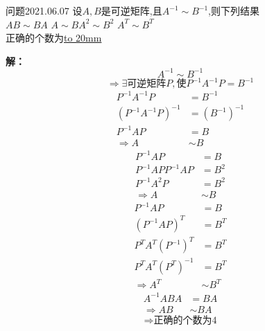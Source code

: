 \begin{mybox}{问题2021.06.07}
	\qquad 设$A,B$是可逆矩阵,且$A^{-1}\sim B^{-1}$,则下列结果\\
	$AB\sim BA$ $A\sim B $$A^{2}\sim B^{2}$ $A^{T}\sim B^{T}$\\
正确的个数为\underline{\hbox to 20mm{}}
\end{mybox}	
\noindent
\textbf{解：}
$$ A^{-1}\sim B^{-1}$$
$$\Rightarrow \exists \text{可逆矩阵}P ,\text{使} P^{-1}A^{-1} P =B^{-1}$$
\begin{align*}
	P^{-1}A^{-1}P &= B^{-1}\\
	(P^{-1}A^{-1}P)^{-1}&=(B^{-1})^{-1}\\
	P^{-1}A P &= B\\
	\Rightarrow A&\sim B
\end{align*}
\begin{align*}
	P^{-1}A P &= B \\
	P^{-1}A P P^{-1} A P &=B^{2}\\
	P^{-1}A^{2} P&=B^{2}\\
	\Rightarrow A&\sim B
\end{align*}
\begin{align*}
	P^{-1}A P &= B \\
	(P^{-1}A P)^{T} &=B^{T}\\
	P^{T} A^{T} (P^{-1})^{T} &=B^{T}\\
	P^{T} A^{T} (P^{T})^{-1} &=B^{T}\\
	\Rightarrow A^{T} &\sim B^{T}
\end{align*}
\begin{align*}
	A^{-1}AB A &= BA \\
	\Rightarrow AB&\sim BA
\end{align*}
$$\Rightarrow \text{正确的个数为4}$$